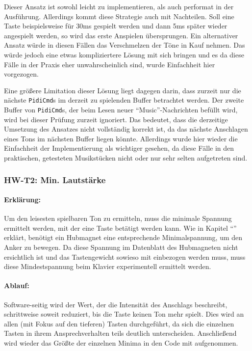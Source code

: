 Dieser Ansatz ist sowohl leicht zu implementieren, als auch performat in der Ausführung.
Allerdings kommt diese Strategie auch mit Nachteilen.
Soll eine Taste beispielsweise für 30ms gespielt werden und dann 5ms später wieder angespielt werden, so wird das erste Anspielen übersprungen.
Ein alternativer Ansatz würde in diesen Fällen das Verschmelzen der Töne in Kauf nehmen.
Das würde jedoch eine etwas kompliziertere Lösung mit sich bringen und es da diese Fälle in der Praxis eher unwahrscheinlich sind, wurde Einfachheit hier vorgezogen.

Eine größere Limitation dieser Lösung liegt dagegen darin, dass zurzeit nur die nächste \lstinline|PidiCmd|s im derzeit zu spielenden Buffer betrachtet werden.
Der zweite Buffer von \lstinline|PidiCmd|s, der beim Lesen neuer \enquote{Music}-Nachrichten befüllt wird, wird bei dieser Prüfung zurzeit ignoriert.
Das bedeutet, dass die derzeitige Umsetzung des Ansatzes nicht vollständig korrekt ist, da das nächste Anschlagen eines Tons im nächsten Buffer liegen könnte.
Allerdings wurde hier wieder die Einfachheit der Implementierung als wichtiger gesehen, da diese Fälle in den praktischen, getesteten Musikstücken nicht oder nur sehr selten aufgetreten sind.


\subsubsection{HW-T2: Min. Lautstärke}

\paragraph{Erklärung:}
Um den leisesten spielbaren Ton zu ermitteln, muss die minimale Spannung ermittelt werden, mit der eine Taste betätigt werden kann.
Wie in Kapitel \enquote{} erklärt, benötigt ein Hubmagnet eine entsprechende Minimalspannung, um den Anker zu bewegen.
Da diese Spannung im Datenblatt des Hubmagneten nicht ersichtlich ist und das Tastengewicht sowieso mit einbezogen werden muss, muss diese Mindestspannung beim Klavier experimentell ermittelt werden.

\paragraph{Ablauf:}
Software-seitig wird der Wert, der die Intensität des Anschlags beschreibt, schrittweise soweit reduziert, bis die Taste keinen Ton mehr spielt.
Dies wird an allen (mit Fokus auf den tieferen) Tasten durchgeführt, da sich die einzelnen Tasten in ihrem Ansprechverhalten teils deutlich unterscheiden. %
Anschließend wird wieder das Größte der einzelnen Minima in den Code mit aufgenommen.

